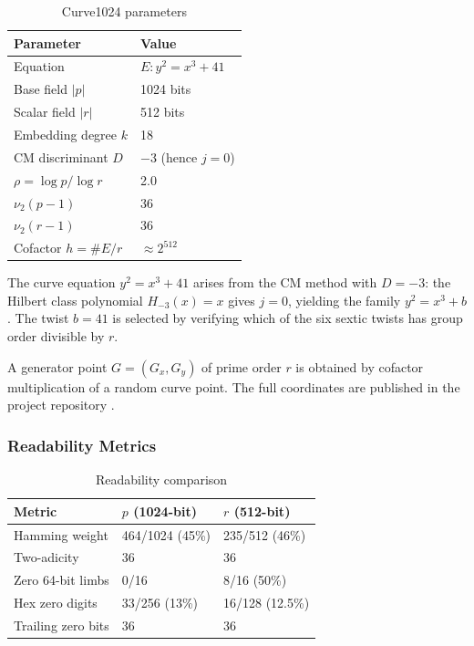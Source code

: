 \begin{table}[t]
\centering
\caption{Curve1024 parameters}
\begin{tabular}{ll}
\toprule
Parameter & Value \\
\midrule
Equation & \(E: y^2 = x^3 + 41\) \\
Base field \(|p|\) & 1024 bits \\
Scalar field \(|r|\) & 512 bits \\
Embedding degree \(k\) & 18 \\
CM discriminant \(D\) & \(-3\) (hence \(j = 0\)) \\
\(\rho = \log p / \log r\) & 2.0 \\
\(\nu_2(p-1)\) & 36 \\
\(\nu_2(r-1)\) & 36 \\
Cofactor \(h = \#E/r\) & \(\approx 2^{512}\) \\
\bottomrule
\end{tabular}
\end{table}

The curve equation \(y^2 = x^3 + 41\) arises from the CM method with
\(D = -3\): the Hilbert class polynomial \(H_{-3}(x) = x\) gives
\(j = 0\), yielding the family \(y^2 = x^3 + b\). The twist \(b = 41\)
is selected by verifying which of the six sextic twists has group order
divisible by \(r\).

A generator point \(G = (G_x, G_y)\) of prime order \(r\) is obtained by
cofactor multiplication of a random curve point. The full coordinates
are published in the project repository \cite{Curve1024Impl}.

\subsubsection{Readability Metrics}\label{readability-metrics}

\begin{table}[t]
\centering
\caption{Readability comparison}
\begin{tabular}{lll}
\toprule
Metric & \(p\) (1024-bit) & \(r\) (512-bit) \\
\midrule
Hamming weight & 464/1024 (45\%) & 235/512 (46\%) \\
Two-adicity & 36 & 36 \\
Zero 64-bit limbs & 0/16 & 8/16 (50\%) \\
Hex zero digits & 33/256 (13\%) & 16/128 (12.5\%) \\
Trailing zero bits & 36 & 36 \\
\bottomrule
\end{tabular}
\end{table}

